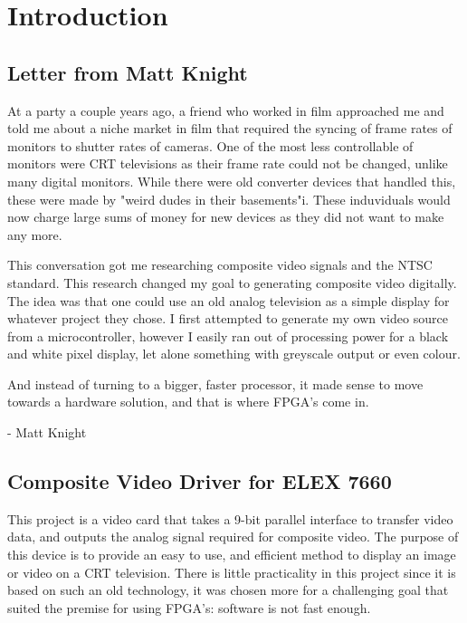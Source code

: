 \section{Introduction}

\subsection{Letter from Matt Knight}

At a party a couple years ago, a friend who worked in film approached me and
told me about a niche market in film that required the syncing of frame rates of
monitors to shutter rates of cameras. One of the most less controllable of
monitors were CRT televisions as their frame rate could not be changed, unlike
many digital monitors. While there were old converter devices that handled this,
these were made by "weird dudes in their basements"i. These induviduals would
now charge large sums of money for new devices as they did not want to make any
more.

This conversation got me researching composite video signals and the NTSC
standard. This research changed my goal to generating composite video digitally.
The idea was that one could use an old analog television as a simple display for
whatever project they chose. I first attempted to generate my own video source
from a microcontroller, however I easily ran out of processing power for a black
and white pixel display, let alone something with greyscale output or even
colour.

And instead of turning to a bigger, faster processor, it made sense to move
towards a hardware solution, and that is where FPGA's come in.

- Matt Knight

\subsection{Composite Video Driver for ELEX 7660}

This project is a video card that takes a 9-bit parallel interface to transfer
video data, and outputs the analog signal required for composite video. The
purpose of this device is to provide an easy to use, and efficient method to
display an image or video on a CRT television. There is little practicality in
this project since it is based on such an old technology, it was chosen more for
a challenging goal that suited the premise for using FPGA's: software is not
fast enough.


